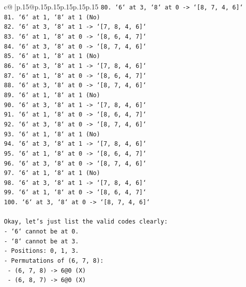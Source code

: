 \documentclass{article}
\begin{document}
{\begin{supertabular}{c@{$\;$}|p{.15\linewidth}@{}p{.15\linewidth}p{.15\linewidth}p{.15\linewidth}p{.15\linewidth}p{.15\linewidth}}
{{{\texttt{80. `6` at 3, `8` at 0 {-}> `{[}8, 7, 4, 6{]}`} \\
\texttt{81. `6` at 1, `8` at 1 (No)} \\
\texttt{82. `6` at 3, `8` at 1 {-}> `{[}7, 8, 4, 6{]}`} \\
\texttt{83. `6` at 1, `8` at 0 {-}> `{[}8, 6, 4, 7{]}`} \\
\texttt{84. `6` at 3, `8` at 0 {-}> `{[}8, 7, 4, 6{]}`} \\
\texttt{85. `6` at 1, `8` at 1 (No)} \\
\texttt{86. `6` at 3, `8` at 1 {-}> `{[}7, 8, 4, 6{]}`} \\
\texttt{87. `6` at 1, `8` at 0 {-}> `{[}8, 6, 4, 7{]}`} \\
\texttt{88. `6` at 3, `8` at 0 {-}> `{[}8, 7, 4, 6{]}`} \\
\texttt{89. `6` at 1, `8` at 1 (No)} \\
\texttt{90. `6` at 3, `8` at 1 {-}> `{[}7, 8, 4, 6{]}`} \\
\texttt{91. `6` at 1, `8` at 0 {-}> `{[}8, 6, 4, 7{]}`} \\
\texttt{92. `6` at 3, `8` at 0 {-}> `{[}8, 7, 4, 6{]}`} \\
\texttt{93. `6` at 1, `8` at 1 (No)} \\
\texttt{94. `6` at 3, `8` at 1 {-}> `{[}7, 8, 4, 6{]}`} \\
\texttt{95. `6` at 1, `8` at 0 {-}> `{[}8, 6, 4, 7{]}`} \\
\texttt{96. `6` at 3, `8` at 0 {-}> `{[}8, 7, 4, 6{]}`} \\
\texttt{97. `6` at 1, `8` at 1 (No)} \\
\texttt{98. `6` at 3, `8` at 1 {-}> `{[}7, 8, 4, 6{]}`} \\
\texttt{99. `6` at 1, `8` at 0 {-}> `{[}8, 6, 4, 7{]}`} \\
\texttt{100. `6` at 3, `8` at 0 {-}> `{[}8, 7, 4, 6{]}`} \\
\\ 
\texttt{Okay, let's just list the valid codes clearly:} \\
\texttt{{-} `6` cannot be at 0.} \\
\texttt{{-} `8` cannot be at 3.} \\
\texttt{{-} Positions: 0, 1, 3.} \\
\texttt{{-} Permutations of (6, 7, 8):} \\
\texttt{    {-} (6, 7, 8) {-}> 6@0 (X)} \\
\texttt{    {-} (6, 8, 7) {-}> 6@0 (X)} \\
}}}
\end{supertabular}}
\end{document}
